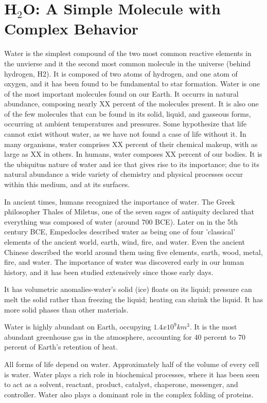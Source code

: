 \section{H$_2$O: A Simple Molecule with Complex Behavior}
Water is the simplest compound of the two most common reactive
elements in the unvierse and it the second most common molecule in the
universe (behind hydrogen, H2). It is composed of two atoms of
hydrogen, and one atom of oxygen, and it has been found to be
fundamental to star formation.  Water is one of the most important
molecules found on our Earth.  It occurrs in natural abundance,
composing nearly XX percent of the molecules present. It is also one
of the few molecules that can be found in its solid, liquid, and
gasseous forms, occurring at ambient temperatures and pressures.  Some
hypothesize that life cannot exist without water, as we have not found
a case of life without it. In many organisms, water comprises XX
percent of their chemical makeup, with as large as XX in others. In
humans, water composes XX percent of our bodies. It is the ubiquitus
nature of water and ice that gives rise to its importance; due to its
natural abundance a wide variety of chemistry and physical processes
occur within this medium, and at its surfaces.

In ancient times, humans recognized the importance of water. The Greek
philosopher Thales of Miletus, one of the seven sages of antiquity
declared that everything was composed of water (around 700 BCE). Later
on in the 5th century BCE, Empedocles described water as being one of
four 'classical' elements of the ancient world, earth, wind, fire, and
water. Even the ancient Chinese described the world around them using
five elements, earth, wood, metal, fire, and water. The importance of
water was discovered early in our human history, and it has been
studied extensively since those early days.  

It has volumetric anomalies-water’s solid (ice) floats on its liquid;
pressure can melt the solid rather than freezing the liquid; heating
can shrink the liquid. It has more solid phases than other materials.

Water is highly abundant on Earth, occupying
$1.4x10^{9} km^{3}$.\cite{2-4} It is the most abundant greenhouse gas
in the atmosphere, accounting for 40 percent to 70 percent of Earth's
retention of heat.

All forms of life depend on water.\cite{5,6} Approximately half of the
volume of every cell is water.\cite{7} Water plays a rich role in
biochemical processes, where it has been seen to act as a solvent,
reactant, product, catalyst, chaperone, messenger, and
controller. Water also plays a dominant role in the complex folding of
proteins.

